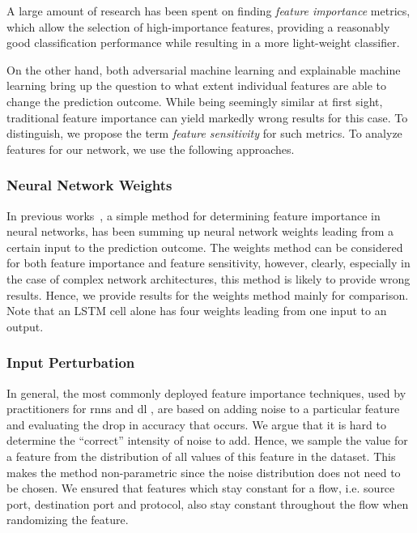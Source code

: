 \documentclass[conference]{IEEEtran}
\begin{document}
A large amount of research has been spent on finding \emph{feature importance} metrics, which allow the selection  of high-importance features, providing a reasonably good classification performance while resulting in a more light-weight classifier.

On the other hand, both adversarial machine learning and explainable machine learning bring up the question to what extent individual features are able to change the prediction outcome. While being seemingly similar at first sight, traditional feature importance can yield markedly wrong results for this case.  To distinguish, we propose the term \emph{feature sensitivity} for such metrics.
To analyze features for our network, we use the following approaches.

\subsubsection{Neural Network Weights}
In previous works~\cite{olden_accurate_2004}, a simple method for determining feature importance in neural networks, has been summing up neural network weights leading from a certain input to the prediction outcome. The weights method can be considered for both feature importance and feature sensitivity, however, clearly, especially in the case of complex network architectures, this method is likely to provide wrong results. Hence, we provide results for the weights method mainly for comparison. Note that an LSTM cell alone has four weights leading from one input to an output.

\subsubsection{Input Perturbation}

 In general, the most commonly deployed feature importance techniques, used by practitioners for \glspl{rnn} \cite{stackexchange_cross_validated_neural_2019} and \gls{dl} \cite{molnar_interpretable_2019,stackexchange_cross_validated_feature_2016,olden_accurate_2004}, are based on adding noise to a particular feature and evaluating the drop in accuracy that occurs. We argue that it is hard to determine the ``correct'' intensity of noise to add. %
 Hence, we sample the value for a feature from the distribution of all values of this feature in the dataset. This makes the method non-parametric since the noise distribution  does not need to be chosen. We ensured that features which stay constant for a flow, i.e. source port, destination port and protocol, also stay constant throughout the flow when randomizing the feature.
\end{document}
